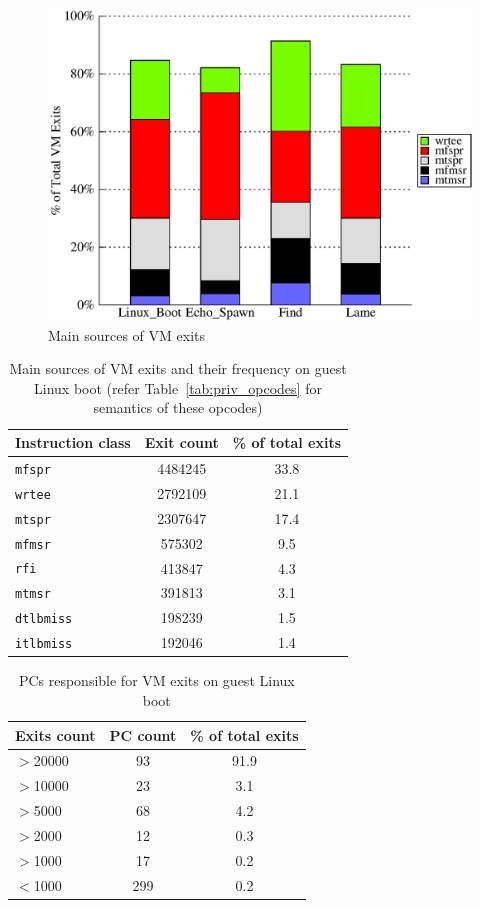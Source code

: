 \begin{figure}[!htb]
\centering
\includegraphics[scale=0.5]{exit_count.eps}
\caption{\label{fig:opcode_exit_fraction}Main sources of VM exits}
\end{figure}

\begin{table}[!b]
\centering
     \begin{tabular}{lcc} \hline
       Instruction class  & Exit count & \% of total exits  \\ \hline
       {\tt mfspr} & 4484245 & 33.8  \\
       {\tt wrtee} & 2792109 & 21.1  \\
       {\tt mtspr} & 2307647 & 17.4  \\
       {\tt mfmsr} & 575302 & 9.5 \\
       {\tt rfi} & 413847 & 4.3 \\
       {\tt mtmsr} & 391813 & 3.1 \\
       {\tt dtlbmiss} & 198239 & 1.5 \\
       {\tt itlbmiss} & 192046 & 1.4 \\
       \hline
     \end{tabular}
\caption{\label{tab:exitcount_linuxboot}Main sources of VM exits and their frequency on guest Linux boot (refer Table~\ref{tab:priv_opcodes} for semantics of these opcodes)}
\end{table}

\begin{table}
\centering
     \begin{tabular}{lcc} \hline
       Exits count  & PC count & \% of total exits  \\ \hline
       $>$20000 & 93 & 91.9  \\
       $>$10000 & 23 & 3.1  \\
       $>$5000 & 68 & 4.2  \\
       $>$2000 & 12 & 0.3 \\
       $>$1000 & 17 & 0.2 \\
       $<$1000 & 299 & 0.2 \\
       \hline
     \end{tabular}
\caption{\label{tab:pcexits_linuxboot}PCs responsible for VM exits on guest Linux boot}
\end{table}

